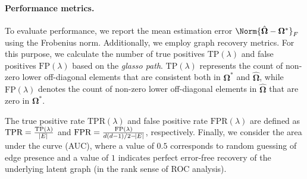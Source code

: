 \paragraph{Performance metrics.}
To evaluate performance, we report the mean estimation error $\Norm{\hat{\mathbf{\Omega}} - \mathbf\Omega^*}_F$ using the Frobenius norm. Additionally, we employ graph recovery metrics. For this purpose, we calculate the number of true positives $\text{TP}(\lambda)$ and false positives $\text{FP}(\lambda)$ based on the \textit{glasso path}. $\text{TP}(\lambda)$ represents the count of non-zero lower off-diagonal elements that are consistent both in $\mathbf\Omega^*$ and $\hat{\mathbf\Omega}$, while $\text{FP}(\lambda)$ denotes the count of non-zero lower off-diagonal elements in $\hat{\mathbf\Omega}$ that are zero in $\mathbf\Omega^*$.

The true positive rate $\text{TPR}(\lambda)$ and false positive rate $\text{FPR}(\lambda)$ are defined as $\text{TPR} = \frac{\text{TP}(\lambda)}{\abs{E}}$ and $\text{FPR} = \frac{\text{FP}(\lambda)}{d(d-1)/2 - \abs{E}}$, respectively. Finally, we consider the area under the curve (AUC), where a value of $0.5$ corresponds to random guessing of edge presence and a value of $1$ indicates perfect error-free recovery of the underlying latent graph (in the rank sense of ROC analysis).